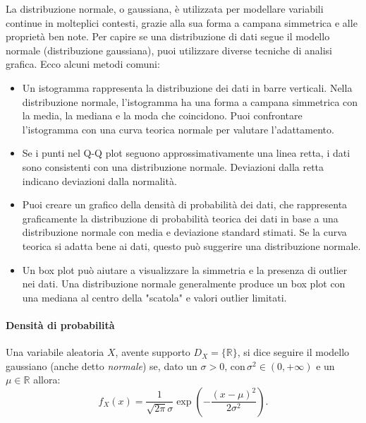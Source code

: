 \noindent La distribuzione normale, o gaussiana, è utilizzata per modellare variabili continue in molteplici contesti, grazie alla sua forma a campana simmetrica e alle proprietà ben note.
\newline \newline
Per capire se una distribuzione di dati segue il modello normale (distribuzione gaussiana), puoi utilizzare diverse tecniche di analisi grafica. Ecco alcuni metodi comuni:
\begin{itemize}
    \item Un istogramma rappresenta la distribuzione dei dati in barre verticali. Nella distribuzione normale, l'istogramma ha una forma a campana simmetrica con la media, la mediana e la moda che coincidono. Puoi confrontare l'istogramma con una curva teorica normale per valutare l'adattamento.
    \item Se i punti nel Q-Q plot seguono approssimativamente una linea retta, i dati sono consistenti con una distribuzione normale. Deviazioni dalla retta indicano deviazioni dalla normalità.
    \item Puoi creare un grafico della densità di probabilità dei dati, che rappresenta graficamente la distribuzione di probabilità teorica dei dati in base a una distribuzione normale con media e deviazione standard stimati. Se la curva teorica si adatta bene ai dati, questo può suggerire una distribuzione normale.
    \item  Un box plot può aiutare a visualizzare la simmetria e la presenza di outlier nei dati. Una distribuzione normale generalmente produce un box plot con una mediana al centro della "scatola" e valori outlier limitati.
\end{itemize}

\paragraph{Densità di probabilità}
Una variabile aleatoria $X$, avente supporto $D_X = \{ \mathbb R \}$, si dice seguire il modello gaussiano (anche detto \textit{normale}) se, dato un $\sigma > 0, \, \text{con} \, \sigma^2 \in \left(0, +\infty\right)$ e un $\mu \in \mathbb R$ allora:
\[
\boxed{
f_X(x) = \frac{1}{\sqrt{2 \pi} \sigma} \exp{\!\left(-\frac{(x-\mu)^2}{2\sigma^2} \right)}
}.
\]


